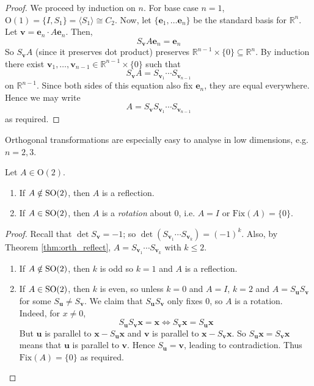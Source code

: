 \documentclass[10pt, a4paper, twoside]{report}
\begin{document}
\begin{proof}
    We proceed by induction on \(n\). For base case \(n=1\), \(\mathrm{O}(1)=\{I,S_1\}=\langle S_1\rangle\cong C_2\). Now, let \(\{\mathbf{e}_1,\ldots\mathbf{e}_n\}\) be the standard basis for \(\mathbb{R}^n\). Let \(\mathbf{v}=\mathbf{e}_n\cdot A\mathbf{e}_n\). Then,
    \[S_\mathbf{v}A\mathbf{e}_n=\mathbf{e}_n\]
    So \(S_\mathbf{v}A\) (since it preserves dot product) preserves \(\mathbb{R}^{n-1}\times\{0\}\subseteq\mathbb{R}^n\). By induction there exist \(\mathbf{v}_1,\ldots,\mathbf{v}_{n-1}\in\mathbb{R}^{n-1}\times\{0\}\) such that 
    \[S_\mathbf{v}A=S_{\mathbf{v}_1}\cdots S_{\mathbf{v}_{n-1}}\]
    on \(\mathbb{R}^{n-1}\). Since both sides of this equation also fix \(\mathbf{e}_n\), they are equal everywhere. Hence we may write 
    \[A=S_\mathbf{v}S_{\mathbf{v}_1}\cdots S_{\mathbf{v}_{n-1}}\]
    as required.  
\end{proof}
Orthogonal transformations are especially easy to analyse in low dimensions, e.g. \(n=2,3\).
\begin{lemma}
    Let \(A\in\mathrm{O}(2)\). 
    \begin{enumerate}
        \item If \(A\notin\operatorname{SO}(2)\), then \(A\) is a reflection.
        \item If \(A\in\operatorname{SO}(2)\), then \(A\) is a \emph{rotation} about 0, i.e. \(A=I\) or \(\text{Fix}(A)=\{0\}\).
    \end{enumerate}
\end{lemma}
\begin{proof}
    Recall that \(\det S_\mathbf{v}=-1\); so \(\det(S_{\mathbf{v}_1}\cdots S_{\mathbf{v}_k})=(-1)^k\). Also, by Theorem \ref{thm:orth_reflect}, \(A=S_{\mathbf{v}_1}\cdots S_{\mathbf{v}_k}\) with \(k\leq 2\). 
    \begin{enumerate}
        \item If \(A\notin\operatorname{SO}(2)\), then \(k\) is odd so \(k=1\) and \(A\) is a reflection.
        \item If \(A\in\operatorname{SO}(2)\), then \(k\) is even, so unless \(k=0\) and \(A=I\), \(k=2\) and \(A=S_\mathbf{u}S_\mathbf{v}\) for some \(S_\mathbf{u}\neq S_\mathbf{v}\). We claim that \(S_\mathbf{u}S_\mathbf{v}\) only fixes \(0\), so \(A\) is a rotation. Indeed, for \(x\neq 0\), 
        \[S_\mathbf{u}S_\mathbf{v}\mathbf{x}=\mathbf{x}\Leftrightarrow S_\mathbf{v}\mathbf{x}=S_\mathbf{u}\mathbf{x}\]
        But \(\mathbf{u}\) is parallel to \(\mathbf{x}-S_\mathbf{u}\mathbf{x}\) and \(\mathbf{v}\) is parallel to \(\mathbf{x}-S_\mathbf{v}\mathbf{x}\). So \(S_\mathbf{u}\mathbf{x}=S_\mathbf{v}\mathbf{x}\) means that \(\mathbf{u}\) is parallel to \(\mathbf{v}\). Hence \(S_\mathbf{u}=\mathbf{v}\), leading to contradiction. Thus \(\text{Fix}(A)=\{0\}\) as required.
    \end{enumerate}
\end{proof}
\end{document}
